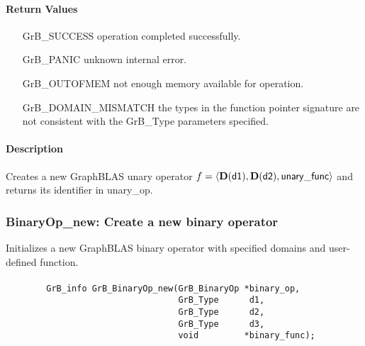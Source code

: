 \paragraph{Return Values}

\begin{itemize}[leftmargin=2.1in]
\item[{\sf GrB\_SUCCESS}]           operation completed successfully.
\item[{\sf GrB\_PANIC}]             unknown internal error.
\item[{\sf GrB\_OUTOFMEM}]          not enough memory available for operation.
\item[{\sf GrB\_DOMAIN\_MISMATCH}]  the types in the function pointer signature are not   
                                    consistent with the {\sf GrB\_Type} parameters specified.
\end{itemize}

\paragraph{Description}

Creates a new GraphBLAS unary operator $f = \langle \bold{D}({\sf d1}), 
\bold{D}({\sf d2}), {\sf unary\_func} \rangle$ and returns its identifier 
in {\sf unary\_op}.




\subsubsection{{\sf BinaryOp\_new}: Create a new binary operator}

Initializes a new GraphBLAS binary operator with specified domains and user-defined function.

\paragraph{\syntax}

\begin{verbatim}
        GrB_info GrB_BinaryOp_new(GrB_BinaryOp *binary_op,
                                  GrB_Type      d1,
                                  GrB_Type      d2,
                                  GrB_Type      d3,
                                  void         *binary_func);
\end{verbatim}

